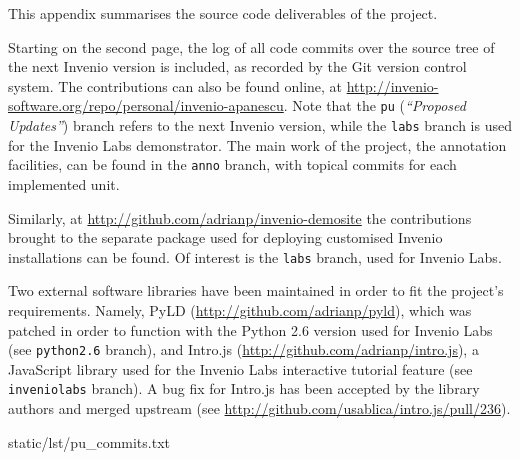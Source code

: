 
This appendix summarises the source code deliverables of the project.

Starting on the second page, the log of all code commits over the source tree
of the next Invenio version is included, as recorded by the Git version control
system. The contributions can also be found online, at
\url{http://invenio-software.org/repo/personal/invenio-apanescu}. Note that the
\texttt{pu} (\textit{``Proposed Updates''}) branch refers to the next Invenio
version, while the \texttt{labs} branch is used for the Invenio Labs
demonstrator. The main work of the project, the annotation facilities, can be
found in the \texttt{anno} branch, with topical commits for each implemented
unit.

Similarly, at \url{http://github.com/adrianp/invenio-demosite} the contributions
brought to the separate package used for deploying customised Invenio
installations can be found. Of interest is the \texttt{labs} branch, used for
Invenio Labs.

Two external software libraries have been maintained in order to fit the
project's requirements. Namely, PyLD (\url{http://github.com/adrianp/pyld}),
which was patched in order to function with the Python 2.6 version used for
Invenio Labs (see \texttt{python2.6} branch), and Intro.js
(\url{http://github.com/adrianp/intro.js}), a JavaScript library used for the
Invenio Labs interactive tutorial feature (see \texttt{inveniolabs} branch).
A bug fix for Intro.js has been accepted by the library authors and merged
upstream (see \url{http://github.com/usablica/intro.js/pull/236}).

\clearpage


  {static/lst/pu_commits.txt}

\clearpage
